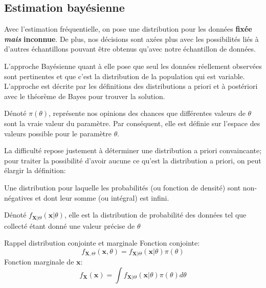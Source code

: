 \documentclass[10pt, french]{article}
\begin{document}
\begin{multicols*}{3}
\setcounter{section}{12}
\columnbreak
\section{Estimation bayésienne}

Avec l'estimation fréquentielle, on pose une distribution pour les données \textbf{fixée} \textit{\textbf{mais}} \textbf{inconnue}. De plus, nos décisions sont axées plus avec les possibilités liés à d'autres échantillons pouvant être obtenus qu'avec notre échantillon de données.

L'approche Bayésienne quant à elle pose que seul les données réellement observées sont pertinentes et que c'est la distribution de la population qui est variable.
L'approche est décrite par les définitions des distributions a priori et à postériori avec le théorème de Bayes pour trouver la solution.

\begin{definition}
Dénoté $\pi(\theta)$, représente nos opinions des chances que différentes valeurs de $\theta$ sont la vraie valeur du paramètre. 
Par conséquent, elle est définie sur l'espace des valeurs possible pour le paramètre $\theta$.
\end{definition}

La difficulté repose justement à déterminer une distribution a priori convaincante; pour traiter la possibilité d'avoir aucune ce qu'est la distribution a priori, on peut élargir la définition:
\begin{definition}
Une distribution pour laquelle les probabilités (ou fonction de densité) sont non-négatives et dont leur somme (ou intégral) est infini.
\end{definition}

\begin{definitionNOHFILL}
Dénoté $f_{\bm{X} | \Theta}(\bm{x} | \theta)$, elle est la distribution de probabilité des données tel que collecté étant donné une valeur précise de $\theta$ 
\end{definitionNOHFILL}

\begin{rappel}{Rappel distribution conjointe et marginale}
Fonction conjointe:
\begin{equation*}
	f_{\bm{X}, \Theta}(\bm{x}, \theta)
	=	f_{\bm{X}|\Theta}(\bm{x} | \theta) \pi(\theta)
\end{equation*}
Fonction marginale de $\bm{x}$:
\begin{equation*}
	f_{\bm{X}}(\bm{x})
	=	\int f_{\bm{X}|\Theta}(\bm{x} | \theta) \pi(\theta) d\theta
\end{equation*}
\end{rappel}


\end{multicols*}
\end{document}
